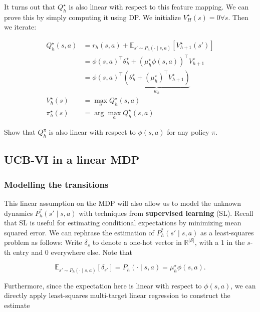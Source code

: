 \documentclass[
  letterpaper,
  DIV=11,
  numbers=noendperiod]{scrreprt}
\theoremstyle{plain}
\theoremstyle{plain}
\theoremstyle{definition}
\theoremstyle{definition}
\theoremstyle{remark}
\begin{document}
It turns out that \(Q^\star_h\) is also linear with respect to this
feature mapping. We can prove this by simply computing it using DP. We
initialize \(V_{H}^\star(s) = 0 \forall s\). Then we iterate:

\[
\begin{aligned}
    Q^\star_h(s, a)  & = r_h(s, a) + \mathbb{E}_{s' \sim P_h(\cdot \mid s, a)} [V^\star_{h+1}(s')]                          \\
                     & = \phi(s, a)^\top \theta_h^\star + (\mu_h^\star \phi(s, a))^\top V^\star_{h+1}               \\
                     & = \phi(s, a)^\top \underbrace{( \theta_h^\star + (\mu_h^\star)^\top  V^\star_{h+1})}_{w_h} \\
    V^\star_h(s)     & = \max_a Q^\star_h(s, a)                                                                       \\
    \pi^\star_h(s) & = \arg\max_a Q^\star_h(s, a)
\end{aligned}
\]

Show that \(Q^\pi_h\) is also linear with respect to \(\phi(s, a)\) for
any policy \(\pi\).

\subsection{UCB-VI in a linear MDP}\label{sec-lin_ucb_vi}

\subsubsection{Modelling the
transitions}\label{modelling-the-transitions-1}

This linear assumption on the MDP will also allow us to model the
unknown dynamics \(P^?_h(s' \mid s, a)\) with techniques from
\textbf{supervised learning} (SL). Recall that SL is useful for
estimating conditional expectations by minimizing mean squared error. We
can rephrase the estimation of \(P^?_h(s' \mid s, a)\) as a
least-squares problem as follows: Write \(\delta_s\) to denote a one-hot
vector in \(\mathbb{R}^{|\mathcal{S}|}\), with a \(1\) in the \(s\)-th
entry and \(0\) everywhere else. Note that

\[\mathbb{E}_{s' \sim P_h(\cdot \mid s, a)} [\delta_{s'}] = P_h(\cdot \mid s, a) = \mu_h^\star \phi(s, a).\]

Furthermore, since the expectation here is linear with respect to
\(\phi(s, a)\), we can directly apply least-squares multi-target linear
regression to construct the estimate
\end{document}
